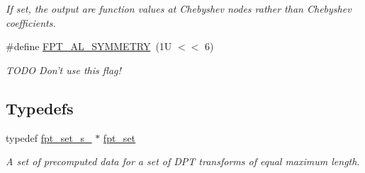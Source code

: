 \begin{CompactItemize}
\begin{CompactList}\small\item\em If set, the output are function values at Chebyshev nodes rather than Chebyshev coefficients. \item\end{CompactList}\item 
\hypertarget{group__fpt_ga13}{
\#define \hyperlink{group__fpt_ga13}{FPT\_\-AL\_\-SYMMETRY}~(1U $<$$<$ 6)}
\label{group__fpt_ga13}

\begin{CompactList}\small\item\em TODO Don't use this flag! \item\end{CompactList}\end{CompactItemize}
\subsection*{Typedefs}
\begin{CompactItemize}
\item 
\hypertarget{group__fpt_ga0}{
typedef \hyperlink{structfpt__set__s__}{fpt\_\-set\_\-s\_\-} $\ast$ \hyperlink{group__fpt_ga0}{fpt\_\-set}}
\label{group__fpt_ga0}

\begin{CompactList}\small\item\em A set of precomputed data for a set of DPT transforms of equal maximum length. \item\end{CompactList}\end{CompactItemize}
